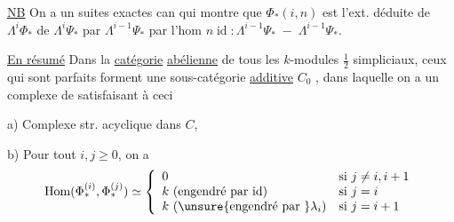 \uline{NB} On a un  suites exactes can
qui montre que $\Phi_*(i,n)$ est l'ext.
déduite de  $\Lambda^i\Phi_*$ de $\Lambda^i\Psi_*$ par $\Lambda^{i-1}\Psi_*$
par l'hom $n\operatorname{id}:\Lambda^{i-1}\Psi_*\;-\;\Lambda^{i-1}\Psi_*$.

\uline{En résumé} Dans la \uline{catégorie}
\uline{abélienne}  de tous les $k$-modules
$\frac12$ simpliciaux, ceux qui sont  parfaits
forment une sous-catégorie \uline{additive}
$C_0$ , dans laquelle
on a un complexe de 
satisfaisant à ceci

a) Complexe str. acyclique dans $C$, 

b) Pour tout $i,j\geq0$, on a
\[
\operatorname{Hom}(\Phi_*^{(i)},\Phi_*^{(j)})\simeq
\left\{\begin{array}{ll}
0&\text{si }j\neq i,i+1\\
k\ (\text{engendré par id})&\text{si }j=i\\
k\ (\unsure{\text{engendré par }}\lambda_i)&\text{si }j=i+1
\end{array}\right.
\]

